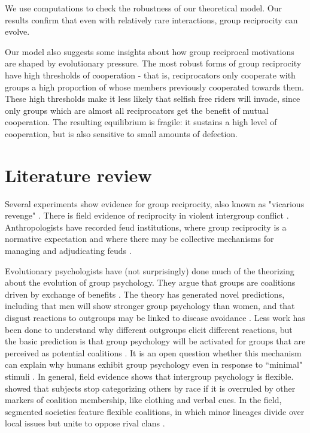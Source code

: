 \documentclass[12pt,a4paper]{article}
\begin{document}
We use computations to check the robustness of our theoretical model. Our results confirm that even with relatively rare interactions, group reciprocity can evolve.

Our model also suggests some insights about how group reciprocal motivations are shaped by evolutionary pressure. The most robust forms of group reciprocity have high thresholds of cooperation - that is, reciprocators only cooperate with groups a high proportion of whose members previously cooperated towards them. These high thresholds make it less likely that selfish free riders will invade, since only groups which are almost all reciprocators get the benefit of mutual cooperation. The resulting equilibrium is fragile: it sustains a high level of cooperation, but is also sensitive to small amounts of defection.


\section{Literature review}

Several experiments show evidence for group reciprocity, also known as "vicarious
revenge" \parencite{lickel_vicarious_2006,gaertner2008whenrejection,stenstrom_roles_2008,hugh2017intergroup,hugh2019humans,romano2022direct}. There is field 
evidence of reciprocity in violent intergroup conflict \parencite{haushofer_both_2010}.
Anthropologists have recorded feud institutions, where group reciprocity is a
normative expectation and where there may be collective mechanisms for managing 
and adjudicating feuds \parencite{boehm1984blood,chagnon1988lifehistories}. 

Evolutionary psychologists have (not surprisingly) done much of the theorizing about the evolution of group psychology. They argue that groups are coalitions driven by exchange of benefits \parencite{tooby2010groups,kurzban2015managing}. The theory has generated novel predictions, including that men will show stronger group psychology than women, and that disgust reactions to outgroups may be linked to disease avoidance \parencite{van2009guns}. Less work has been done to understand why different outgroups elicit different reactions, but the basic prediction is that group psychology will be activated for groups that are perceived as potential coalitions \parencite{kurzban2001can}. It is an open question whether this mechanism can explain why humans exhibit group psychology even in response to ``minimal" stimuli \parencite{tajfel1971social,dunham2018mere}. In general, field
evidence shows that intergroup psychology is flexible. \textcite{kurzban2001can} showed that subjects stop categorizing others by race if it is overruled by other markers of coalition membership, like clothing and verbal cues. In the field, segmented societies feature flexible coalitions, in which minor lineages divide over local issues but unite to oppose rival clans \parencite{fortes2015african}.
\end{document}
